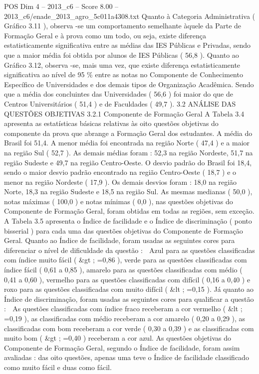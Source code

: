 \begin{textsample}{POS Dim 4 – 2013\_c6 – Score 8.00 – 2013\_c6/enade\_2013\_agro\_5c011a4308.txt}
Quanto à Categoria Administrativa ( Gráfico 3.11 ), observa -se um comportamento semelhante àquele da Parte de Formação Geral e à prova como um todo, ou seja, existe diferença estatisticamente significativa entre as médias das IES Públicas e Privadas, sendo que a maior média foi obtida por alunos de IES Públicas ( 56,8 ).
Quanto ao Gráfico 3.12, observa -se, mais uma vez, que existe diferença estatisticamente significativa ao nível de 95 \% entre as notas no Componente de Conhecimento Específico de Universidades e dos demais tipos de Organização Acadêmica.
Sendo que a média dos concluintes das Universidades ( 56,6 ) foi maior do que de Centros Universitários ( 51,4 ) e de Faculdades ( 49,7 ). 3.2 ANÁLISE DAS QUESTÕES OBJETIVAS 3.2.1 Componente de Formação Geral A Tabela 3.4 apresenta as estatísticas básicas relativas às oito questões objetivas do componente da prova que abrange a Formação Geral dos estudantes.
A média do Brasil foi 51,4.
A menor média foi encontrada na região Norte ( 47,4 ) e a maior na região Sul ( 52,7 ).
As demais médias foram : 52,3 na região Nordeste, 51,7 na região Sudeste e 49,7 na região Centro-Oeste.
O desvio padrão do Brasil foi 18,4, sendo o maior desvio padrão encontrado na região Centro-Oeste ( 18,7 ) e o menor na região Nordeste ( 17,9 ).
Os demais desvios foram : 18,0 na região Norte, 18,3 na região Sudeste e 18,5 na região Sul.
As mesmas medianas ( 50,0 ), notas máximas ( 100,0 ) e notas mínimas ( 0,0 ), nas questões objetivas do Componente de Formação Geral, foram obtidas em todas as regiões, sem exceção.
A Tabela 3.5 apresenta o Índice de facilidade e o Índice de discriminação ( ponto bisserial ) para cada uma das questões objetivas do Componente de Formação Geral.
Quanto ao Índice de facilidade, foram usadas as seguintes cores para diferenciar o nível de dificuldade da questão :  Azul para as questões classificadas com índice muito fácil ( \&gt ; =0,86 ), verde para as questões classificadas com índice fácil ( 0,61 a 0,85 ), amarelo para as questões classificadas com médio ( 0,41 a 0,60 ), vermelho para as questões classificadas com difícil ( 0,16 a 0,40 ) e roxo para as questões classificadas com muito difícil ( \&lt ; =0,15 ).
Já quanto ao Índice de discriminação, foram usadas as seguintes cores para qualificar a questão :  As questões classificadas com índice fraco receberam a cor vermelho ( \&lt ; =0,19 ), as classificadas com médio receberam a cor amarelo ( 0,20 a 0,29 ), as classificadas com bom receberam a cor verde ( 0,30 a 0,39 ) e as classificadas com muito bom ( \&gt ; =0,40 ) receberam a cor azul.
As questões objetivas do Componente de Formação Geral, segundo o Índice de facilidade, foram assim avaliadas : das oito questões, apenas uma teve o Índice de facilidade classificado como muito fácil e duas como fácil.

\end{textsample}
